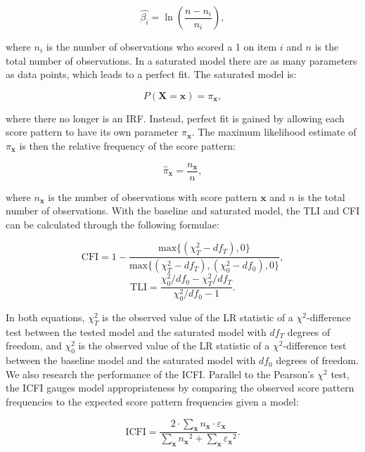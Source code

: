 \documentclass[Royal,sageapa,times,doublespace]{sagej}
\begin{document}
\begin{equation*}
\hat{\beta_{i}} = \ln(\frac{n - n_i}{n_i}), 
\end{equation*}

where $n_i$ is the number of observations who scored a 1 on item $i$ and $n$ is the total number of observations. In a saturated model there are as many parameters as data points, which leads to a perfect fit. The saturated model is:

\begin{equation}
P(\boldsymbol{X} = \boldsymbol{x}) = \pi_{\boldsymbol{x}},
\end{equation}

where there no longer is an IRF. Instead, perfect fit is gained by allowing each score pattern to have its own parameter $\pi_{\boldsymbol{x}}$. The maximum likelihood estimate of $\pi_{\boldsymbol{x}}$ is then the relative frequency of the score pattern:

\begin{equation*}
\hat{\pi}_{\boldsymbol{x}} = \frac{n_{\boldsymbol{x}}}{n},
\end{equation*}

where $n_{\boldsymbol{x}}$ is the number of observations with score pattern $\boldsymbol{x}$ and $n$ is the total number of observations. With the baseline and saturated model, the TLI and CFI can be calculated through the following formulae:

\begin{equation}
\text{CFI} = 1 - \frac{\text{max}\{(\chi^2_T - df_T), 0\}}{\text{max}\{(\chi^2_T - df_T), (\chi^2_0 - df_0), 0\}},
\end{equation}
\begin{equation}
\text{TLI} = \frac{\chi^2_0/df_0 - \chi^2_T/df_T}{\chi^2_0/df_0 - 1}.
\end{equation}

In both equations, $\chi^{2}_{T}$ is the observed value of the LR statistic of a $\chi^2$-difference test between the tested model and the saturated model with $df_T$ degrees of freedom, and $\chi^{2}_{0}$ is the observed value of the LR statistic of a $\chi^2$-difference test between the baseline model and the saturated model with $df_0$ degrees of freedom. We also research the performance of the ICFI. Parallel to the Pearson's $\chi^2$ test, the ICFI gauges model appropriateness by comparing the observed score pattern frequencies to the expected score pattern frequencies given a model:

\begin{equation}
\text{ICFI} = \frac{2 \cdot \sum_{\boldsymbol{x}}  n_{\boldsymbol{x}} \cdot \varepsilon_{\boldsymbol{x}}  }{  \sum_{\boldsymbol{x}}  {n_{\boldsymbol{x}}}^2 +  \sum_{\boldsymbol{x}}  {\varepsilon_{\boldsymbol{x}}} ^2 }.
\end{equation}
\end{document}
